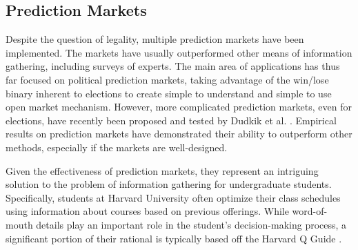 \subsection{Prediction Markets}
Despite the question of legality, multiple prediction markets have been implemented. The markets have usually outperformed other means of information gathering, including surveys of experts. The main area of applications has thus far focused on political prediction markets, taking advantage of the win/lose binary inherent to elections to create simple to understand and simple to use open market mechanism. However, more complicated prediction markets, even for elections, have recently been proposed and tested by Dudkik et al. \cite{dudik}. Empirical results on prediction markets have demonstrated their ability to outperform other methods, especially if the markets are well-designed.

Given the effectiveness of prediction markets, they represent an intriguing solution to the problem of information gathering for undergraduate students. Specifically, students at Harvard University often optimize their class schedules using information about courses based on previous offerings. While word-of-mouth details play an important role in the student's decision-making process, a significant portion of their rational is typically based off the Harvard Q Guide \cite{cue}. 

